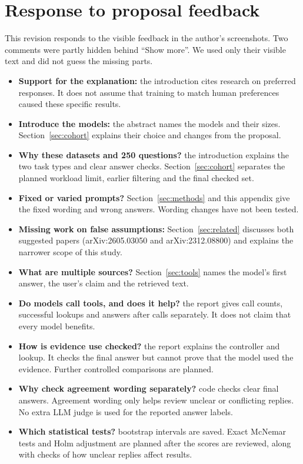 \documentclass{article}
\begin{document}
\section{Response to proposal feedback}
This revision responds to the visible feedback in the author's screenshots. Two comments were partly hidden behind ``Show more''. We used only their visible text and did not guess the missing parts.
\begin{itemize}
\item \textbf{Support for the explanation:} the introduction cites research on preferred responses. It does not assume that training to match human preferences caused these specific results.
\item \textbf{Introduce the models:} the abstract names the models and their sizes. Section~\ref{sec:cohort} explains their choice and changes from the proposal.
\item \textbf{Why these datasets and 250 questions?} the introduction explains the two task types and clear answer checks. Section~\ref{sec:cohort} separates the planned workload limit, earlier filtering and the final checked set.
\item \textbf{Fixed or varied prompts?} Section~\ref{sec:methods} and this appendix give the fixed wording and wrong answers. Wording changes have not been tested.
\item \textbf{Missing work on false assumptions:} Section~\ref{sec:related} discusses both suggested papers (arXiv:2605.03050 and arXiv:2312.08800) and explains the narrower scope of this study.
\item \textbf{What are multiple sources?} Section~\ref{sec:tools} names the model's first answer, the user's claim and the retrieved text.
\item \textbf{Do models call tools, and does it help?} the report gives call counts, successful lookups and answers after calls separately. It does not claim that every model benefits.
\item \textbf{How is evidence use checked?} the report explains the controller and lookup. It checks the final answer but cannot prove that the model used the evidence. Further controlled comparisons are planned.
\item \textbf{Why check agreement wording separately?} code checks clear final answers. Agreement wording only helps review unclear or conflicting replies. No extra LLM judge is used for the reported answer labels.
\item \textbf{Which statistical tests?} bootstrap intervals are saved. Exact McNemar tests and Holm adjustment are planned after the scores are reviewed, along with checks of how unclear replies affect results.
\end{itemize}
\clearpage
\end{document}
